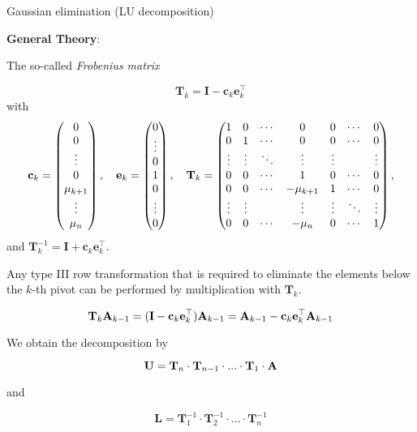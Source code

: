 \begin{vbframe}{Gaussian elimination (LU decomposition)}
\begin{enumerate}
\textbf{General Theory}:\\
\medskip

The so-called \emph{Frobenius matrix}

$$
\mathbf{T}_k = \mathbf{I} - \mathbf{c}_k\mathbf{e}_k^\top
$$
with \scriptsize
$$
\mathbf{c}_k = \begin{pmatrix} 
0 \\
0 \\
\vdots \\
0 \\
\mu_{k + 1} \\
\vdots \\
\mu_n  \end{pmatrix},
\quad \mathbf{e}_k = \begin{pmatrix} 
0 \\
\vdots \\
0 \\
1 \\
0 \\
\vdots \\
0  \end{pmatrix}, \quad
\mathbf{T}_k = \begin{pmatrix} 
1      & 0      & \cdots & 0            & 0      & \cdots & 0 \\
0      & 1      & \cdots & 0            & 0      & \cdots & 0 \\
\vdots & \vdots & \ddots & \vdots       & \vdots &        & \vdots \\
0      & 0      & \cdots & 1            & 0      & \cdots & 0 \\
0      & 0      & \cdots & -\mu_{k + 1} & 1      & \cdots & 0 \\
\vdots & \vdots &        & \vdots       & \vdots & \ddots & \vdots \\
0      & 0      & \cdots & -\mu_n       & 0      & \cdots & 1  \end{pmatrix},
$$ \normalsize
and $\mathbf{T}_k^{-1} = \mathbf{I} + \mathbf{c}_k\mathbf{e}_k^\top$.

\framebreak

Any type III row transformation that is required to eliminate the elements below the $k$-th pivot can be performed by multiplication with $\mathbf{T}_k$.

$$
\mathbf{T}_k\mathbf{A}_{k - 1} = (\mathbf{I} - \mathbf{c}_k\mathbf{e}_k^\top)\mathbf{A}_{k - 1} =
\mathbf{A}_{k - 1} - \mathbf{c}_k\mathbf{e}_k^\top\mathbf{A}_{k - 1}
$$

\lz

We obtain the decomposition by 

$$
\mathbf{U} = \mathbf{T}_n\cdot \mathbf{T}_{n - 1} \cdot ... \cdot \mathbf{T}_1 \cdot \mathbf{A}
$$

and

$$
\mathbf{L} = \mathbf{T}_1^{-1} \cdot \mathbf{T}_2^{-1} \cdot ... \cdot \mathbf{T}_n^{-1}
$$


\end{enumerate}
\end{vbframe}
